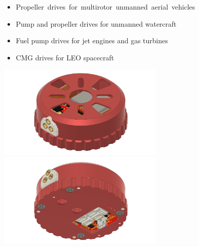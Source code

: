 \documentclass{../document_templates/documentation_template_latex/zubaxdoc}
\begin{document}
\begin{titlepage}
\begin{itemize}
    \item \mbox{Propeller drives for multirotor unmanned aerial vehicles}
    \item Pump and propeller drives for unmanned watercraft
    \item Fuel pump drives for jet engines and gas turbines
    \item CMG drives for LEO spacecraft 
\end{itemize}

\centering
\includegraphics[width=0.6\textwidth]{figures/top view.png}
\includegraphics[width=0.6\textwidth]{figures/bottom view.png}
\end{titlepage}

\tableofcontents
\BeginRightColumn
\listoffigures
\listoftables

\mainmatter







\end{document}
